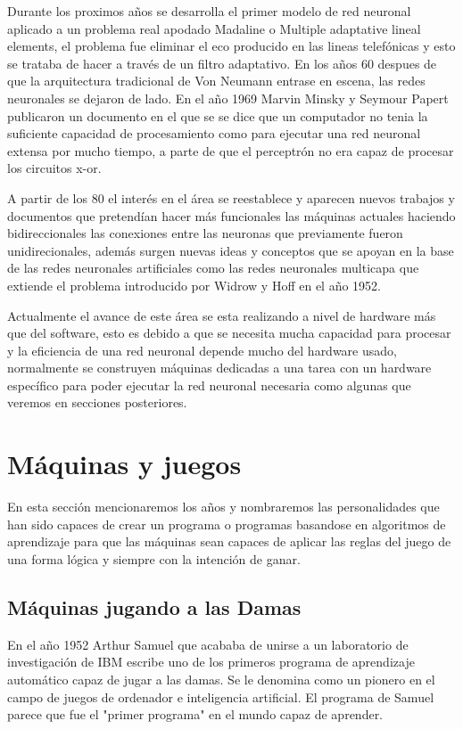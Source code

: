 \documentclass[a4paper, 11pt]{article} %
\begin{document}
Durante los proximos años se desarrolla el primer modelo de red neuronal aplicado a un problema real apodado Madaline o Multiple adaptative lineal elements, el problema fue eliminar el eco producido en las lineas telefónicas y esto se trataba de hacer a través de un filtro adaptativo. En los años 60 despues de que la arquitectura tradicional de Von Neumann entrase en escena, las redes neuronales
se dejaron de lado. En el año 1969 Marvin Minsky y Seymour Papert publicaron un documento en el que se se dice que un computador no tenia la suficiente capacidad de procesamiento como para ejecutar una red neuronal extensa por mucho tiempo, a parte de que el perceptrón no era capaz de procesar los circuitos x-or.

A partir de los 80 el interés en el área se reestablece y aparecen nuevos trabajos y documentos que pretendían hacer más funcionales las máquinas actuales haciendo bidireccionales las conexiones entre las neuronas que previamente fueron unidirecionales, además surgen nuevas ideas y conceptos que se apoyan en la base de las redes neuronales artificiales como las redes neuronales multicapa que extiende el problema introducido por Widrow y Hoff en el año 1952. 

Actualmente el avance de este área se esta realizando a nivel de hardware más que del software, esto es debido a que se necesita mucha capacidad para procesar y la eficiencia de una red neuronal depende mucho del hardware usado, normalmente se construyen máquinas dedicadas a una tarea con un hardware específico para poder ejecutar la red neuronal necesaria como algunas que veremos en secciones posteriores.

\section{Máquinas y juegos}
En esta sección mencionaremos los años y nombraremos las personalidades que han sido capaces de crear un programa o programas basandose en algoritmos de aprendizaje para que las máquinas sean capaces de aplicar las reglas del juego de una forma lógica y siempre con la intención de ganar.
\subsection{Máquinas jugando a las Damas}
En el año 1952 Arthur Samuel que acababa de unirse a un laboratorio de investigación de IBM escribe uno de los primeros programa de aprendizaje automático capaz de jugar a las damas. Se le denomina como un pionero en el campo de juegos de ordenador e inteligencia artificial. El programa de Samuel parece que fue el "primer programa" en el mundo capaz de aprender.
\end{document}
